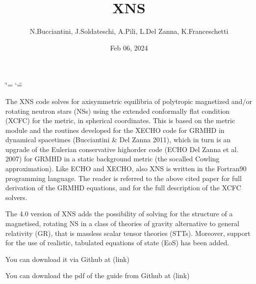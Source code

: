 \documentclass[letterpaper,10pt,english]{sphinxmanual}
\title{XNS}
\date{Feb 06, 2024}
\author{N.Bucciantini, J.Soldateschi, A.Pili, L.Del Zanna, K.Franceschetti}
\begin{document}
\ifdefined\shorthandoff
  \ifnum\catcode`\=\string=\active\shorthandoff{=}\fi
  \ifnum\catcode`\"=\active{}\fi
\fi

\pagestyle{empty}
\sphinxmaketitle
\pagestyle{plain}
\sphinxtableofcontents
\pagestyle{normal}
\label{\detokenize{index::doc}}
\sphinxstepscope



\sphinxAtStartPar
The XNS code solves for axisymmetric equilibria of polytropic magnetized and/or rotating neutron stars (NSs) using the extended conformally flat condition (XCFC) for the metric, in spherical coordinates. This is based on the metric module and the routines developed for the X\sphinxhyphen{}ECHO code for GRMHD in dynamical spacetimes (Bucciantini \& Del Zanna 2011), which in turn is an upgrade of the Eulerian conservative high\sphinxhyphen{}order code (ECHO Del Zanna et al. 2007) for GRMHD in a static background metric (the so\sphinxhyphen{}called Cowling approximation). Like ECHO and X\sphinxhyphen{}ECHO, also XNS is written in the Fortran90 programming language. The reader is referred to the above cited paper for full derivation of the GRMHD equations, and for the full description of the XCFC solvers.

\sphinxAtStartPar
The 4.0 version of XNS adds the possibility of solving for the structure of a magnetised, rotating NS in a class of theories of gravity alternative to general relativity (GR), that is massless scalar tensor theories (STTs). Moreover, support for the use of realistic, tabulated equations of state (EoS) has been added.

\sphinxAtStartPar
You can download it via Github at (link)

\sphinxAtStartPar
You can download the pdf of the guide from Github at (link)
\end{document}
